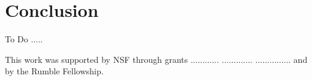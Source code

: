 \documentclass[sigconf]{acmart}
\begin{document}




\maketitle








\section{Conclusion}\label{sec:conclusion}
To Do ..... 

\begin{acks}
This work was supported by NSF through grants ............ ............. ...............  and by the Rumble Fellowship. 
\end{acks}




%
 
\end{document}
